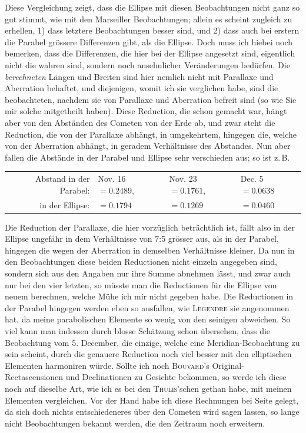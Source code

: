 \par\indent Diese Vergleichung zeigt, dass die Ellipse mit diesen Beobachtungen nicht ganz so gut stimmt, wie mit den Marseiller Beobachtungen; allein es scheint zugleich zu erhellen, 1) dass letztere Beobachtungen besser sind, und 2) dass auch bei erstern die Parabel grössere Differenzen gibt, als die Ellipse. Doch muss ich hiebei noch bemerken, dass die Differenzen, die hier bei der Ellipse angesetzt sind, eigentlich nicht die wahren sind, sondern noch ansehnlicher Veränderungen bedürfen. Die \emph{berechneten} Längen und Breiten sind hier nemlich nicht mit Parallaxe und Aberration behaftet, und diejenigen, womit ich sie verglichen habe, sind die beobachteten, nachdem sie von Parallaxe und Aberration befreit sind (so wie Sie mir solche mitgetheilt haben). Diese Reduction, die schon gemacht war, hängt aber von den Abständen des Cometen von der Erde ab, und zwar steht die Reduction, die von der Parallaxe abhängt, in umgekehrtem, hingegen die, welche von der Aberration abhängt, in geradem Verhältnisse des Abstandes. Nun aber fallen die Abstände in der Parabel und Ellipse sehr verschieden aus; so ist z.\,B.

\begin{center}\begingroup
\fontsize{9}{11}\selectfont
\setlength{\tabcolsep}{2pt}\renewcommand{\arraystretch}{1.12}
\begin{tabular}{rlll}
Abstand in der Parabel: & Nov. 16 $=0.2489$, & Nov. 23 $=0.1761$, & Dec. 5 $=0.0638$ \\
in der Ellipse: & $=0.1794$ & $=0.1269$ & $=0.0460$ \\
\end{tabular}\endgroup\end{center}
%
\par\indent Die Reduction der Parallaxe, die hier vorzüglich beträchtlich ist, fällt also in der Ellipse ungefähr in dem Verhältnisse von 7:5 grösser aus, als in der Parabel, hingegen die wegen der Aberration in demselben Verhältnisse kleiner. Da nun in den Beobachtungen diese beiden Reductionen nicht einzeln angegeben sind, sondern sich aus den Angaben nur ihre Summe abnehmen lässt, und zwar auch nur bei den vier letzten, so müsste man die Reductionen für die Ellipse von neuem berechnen, welche Mühe ich mir nicht gegeben habe. Die Reductionen in der Parabel hingegen werden eben so ausfallen, wie \textsc{Legendre} sie angenommen hat, da meine parabolischen Elemente so wenig von den seinigen abweichen. So viel kann man indessen durch blosse Schätzung schon übersehen, dass die Beobachtung vom 5. December, die einzige, welche eine Meridian-Beobachtung zu sein scheint, durch die genauere Reduction noch viel besser mit den elliptischen Elementen harmoniren würde. Sollte ich noch \textsc{Bouvard}'s Original-Rectascensionen und Declinationen zu Gesichte bekommen, so werde ich diese noch auf dieselbe Art, wie ich es bei den \textsc{Thulis}'schen gethan habe, mit meinen Elementen vergleichen. Vor der Hand habe ich diese Rechnungen bei Seite gelegt, da sich doch nichts entschiedeneres über den Cometen wird sagen lassen, so lange nicht Beobachtungen bekannt werden, die den Zeitraum noch erweitern.

